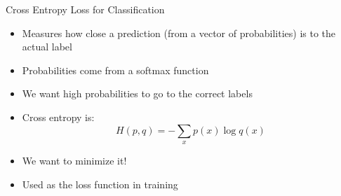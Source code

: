 \documentclass[aspectratio=169]{beamer}
\begin{document}
\begin{frame}{Cross Entropy Loss for Classification}

\begin{itemize}
\item Measures how close a prediction (from a vector of probabilities) is to the actual label
\item Probabilities come from a softmax function
\item We want high probabilities to go to the correct labels
\item Cross entropy is:
$$H(p, q) = -\sum_x p(x) \log q (x)$$
\item We want to minimize it!
\item Used as the loss function in training
\end{itemize}

\end{frame}
\end{document}
